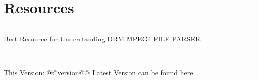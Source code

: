 \section{Resources}
\hrule

\medskip

\href{https://ottverse.com/eme-cenc-cdm-aes-keys-drm-digital-rights-management/}{Best Resource for Understanding DRM}
\href{http://mp4parser.com}{MPEG4 FILE PARSER}
\vfill
\hrule
~\\
This Version: @@version@@
Latest Version can be found \href{https://github.com/robert-will-brown/video-tech-cheatsheet}{here}.
